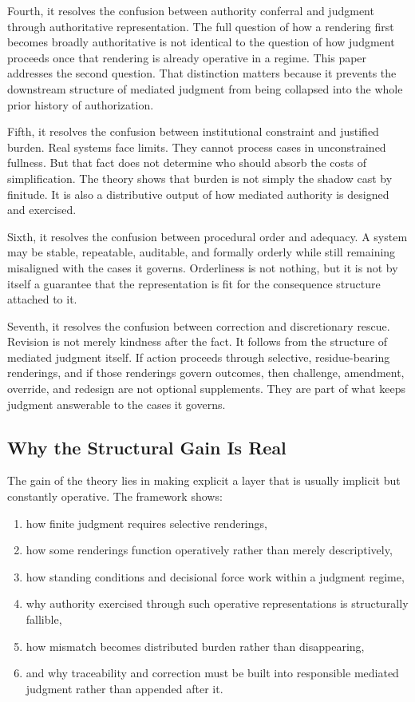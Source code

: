 \documentclass[11pt]{article}
\begin{document}
Fourth, it resolves the confusion between authority conferral and judgment through authoritative representation. The full question of how a rendering first becomes broadly authoritative is not identical to the question of how judgment proceeds once that rendering is already operative in a regime. This paper addresses the second question. That distinction matters because it prevents the downstream structure of mediated judgment from being collapsed into the whole prior history of authorization.

Fifth, it resolves the confusion between institutional constraint and justified burden. Real systems face limits. They cannot process cases in unconstrained fullness. But that fact does not determine who should absorb the costs of simplification. The theory shows that burden is not simply the shadow cast by finitude. It is also a distributive output of how mediated authority is designed and exercised.

Sixth, it resolves the confusion between procedural order and adequacy. A system may be stable, repeatable, auditable, and formally orderly while still remaining misaligned with the cases it governs. Orderliness is not nothing, but it is not by itself a guarantee that the representation is fit for the consequence structure attached to it.

Seventh, it resolves the confusion between correction and discretionary rescue. Revision is not merely kindness after the fact. It follows from the structure of mediated judgment itself. If action proceeds through selective, residue-bearing renderings, and if those renderings govern outcomes, then challenge, amendment, override, and redesign are not optional supplements. They are part of what keeps judgment answerable to the cases it governs.

\subsection{Why the Structural Gain Is Real}

The gain of the theory lies in making explicit a layer that is usually implicit but constantly operative. The framework shows:
\begin{enumerate}
    \item how finite judgment requires selective renderings,
    \item how some renderings function operatively rather than merely descriptively,
    \item how standing conditions and decisional force work within a judgment regime,
    \item why authority exercised through such operative representations is structurally fallible,
    \item how mismatch becomes distributed burden rather than disappearing,
    \item and why traceability and correction must be built into responsible mediated judgment rather than appended after it.
\end{enumerate}
\end{document}
